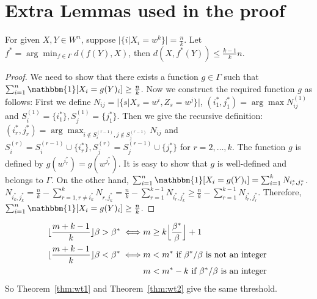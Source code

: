 \documentclass{article}
\begin{document}
\section{Extra Lemmas used in the proof}
\begin{lemma}
	For given $X, Y \in W^n$, suppose $|\{i | X_i = w^k \}| = \frac{n}{k}$.
	Let $f^*=\arg\min_{f \in \Gamma } d(f(Y), X)$, then $d(X,f^*(Y)) \leq \frac{k-1}{k}n$.
\end{lemma}
\begin{proof}
	We need to show that there exists a function $g\in \Gamma$ such that $\sum_{i=1}^n \mathbbm{1}[X_i=g(Y)_i] \geq \frac{n}{k}$.
	Now we construct the required function $g$ as follows:
	First we define $N_{ij} = |\{s | X_s = w^i, Z_s = w^j\}|$, $(i_1^*,j_1^*) = \arg\max N^{(1)}_{ij}$ and $S^{(1)}_i = \{i_1^*\}, S_j^{(1)}=\{j_1^*\}$.
	Then we give the recursive definition:
	$(i_r^*,j_r^*) = \arg\max_{i \not\in S_i^{(r-1)}, j \not\in S_j^{(r-1)}} N_{ij}$ and $S^{(r)}_i = S^{(r-1)}_i \cup \{i_r^*\}, S_j^{(r)}= S_j^{(r-1)}\cup \{j_r^*\}$ for $r=2, \dots, k$.
	The function $g$ is defined by $g(w^{i_r^*}) = g(w^{j_r^*})$. It is easy to show that $g$ is well-defined and belongs to $\Gamma$.
	On the other hand, $\sum_{i=1}^n \mathbbm{1}[X_i=g(Y)_i] = \sum_{i=1}^k N_{i_r^*,j_r^*}$.
	$N_{i_k^*, j_k^*} = \frac{n}{k} - \sum_{r=1, r\neq i_k^*}^k N_{r,j_k^*} = \frac{n}{k} - \sum_{r=1}^{k-1} N_{i^*_r,j_k^*} \geq \frac{n}{k} - \sum_{r=1}^{k-1} N_{i^*_r,j^*_r}$. Therefore,  $\sum_{i=1}^n \mathbbm{1}[X_i=g(Y)_i] \geq \frac{n}{k}$.
\end{proof}
\begin{lemma}\label{lem:thm23eq}
\begin{align}
\lfloor \frac{m+k-1}{k} \rfloor \beta>\beta^\ast \iff  & m\ge k \Big\lfloor \frac{\beta^\ast}{\beta} \Big\rfloor + 1 \label{eq:m2} \\
\lfloor \frac{m+k-1}{k} \rfloor \beta <\beta^\ast  \iff & m <  m^* \textrm{ if } \beta^*/\beta \textrm{ is not an integer } \notag \\
& m <  m^* - k \textrm{ if } \beta^*/\beta \textrm{ is an integer } \label{eq:m22}
\end{align}
So Theorem~\ref{thm:wt1} and Theorem~\ref{thm:wt2} give the same threshold.
\end{lemma}
\end{document}

